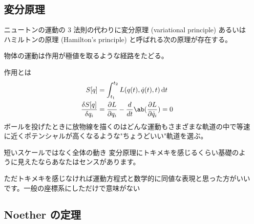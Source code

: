 \documentclass[uplatex,dvipdfmx,a4paper,11pt]{jlreq}
\numberwithin{equation}{section}
\theoremstyle{definition}
\begin{document}
\subsection{変分原理}
ニュートンの運動の 3 法則の代わりに変分原理 (variational principle) あるいはハミルトンの原理 (Hamilton's principle) と呼ばれる次の原理が存在する。
\begin{axiom}[変分原理]
  物体の運動は作用が極値を取るような経路をたどる。
\end{axiom}
作用とは
\begin{align}
  S[q]                           & = \int_{t_1}^{t_2}L(q(t), \dot{q}(t), t)\dl{t}                                                 \\
  \frac{\delta S[q]}{\delta q_i} & = \frac{\partial L}{\partial q_i} - \frac{d}{dt}\ab(\frac{\partial L}{\partial \dot{q}_i}) = 0
\end{align}
ボールを投げたときに放物線を描くのはどんな運動もさまざまな軌道の中で等速に近くポテンシャルが高くなるような"ちょうどいい"軌道を選ぶ。

短いスケールではなく全体の動き
変分原理にトキメキを感じるくらい基礎のように見えたならあなたはセンスがあります。

ただトキメキを感じなければ運動方程式と数学的に同値な表現と思った方がいいです。一般の座標系にしただけで意味がない

\subsection{Noether の定理}
\end{document}
